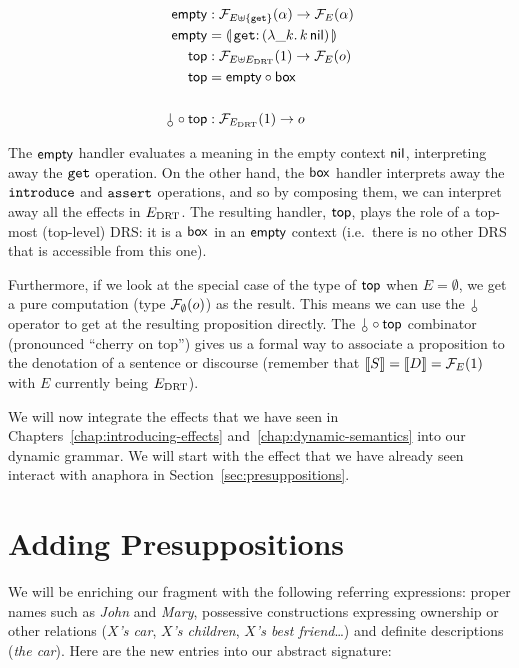 \begin{align*}
  \EMPTY &: \FF_{E \uplus \{\op{get}\}}(\alpha) \to \FF_E(\alpha) \\
  \EMPTY &= \banana{\onto{\op{get}}{(\lam{\_ k}{\ap{k}{\nil}})}} \\
  \TOP &: \FF_{E \uplus E_\DRT}(1) \to \FF_{E}(o) \\
  \TOP &= \EMPTY \comp \BOX \\
  \\
  \cherry \comp \TOP &: \FF_{E_\DRT}(1) \to o
\end{align*}

The $\mathsf{empty}$ handler evaluates a meaning in the empty context $\mathsf{nil}$,
interpreting away the $\mathtt{get}$ operation. On the other hand, the $\mathsf{box}$
handler interprets away the $\mathtt{introduce}$ and $\mathtt{assert}$ operations,
and so by composing them, we can interpret away all the effects in
$E_{\mathrm{DRT}}$. The resulting handler, $\mathsf{top}$, plays the role of a top-most
(top-level) DRS: it is a $\mathsf{box}$ in an $\mathsf{empty}$ context (i.e.\ there is no
other DRS that is accessible from this one).

Furthermore, if we look at the special case of the type of $\mathsf{top}$ when
$E = \emptyset$, we get a pure computation (type $\mathcal{F}_\emptyset(o)$) as the
result. This means we can use the $\cherry$ operator to get at the
resulting proposition directly. The $\cherry \comp \TOP$ combinator
(pronounced ``cherry on top'') gives us a formal way to associate a
proposition to the denotation of a sentence or discourse (remember that
$\llbracket S \rrbracket = \llbracket D \rrbracket = \mathcal{F}_E(1)$ with $E$ currently being $E_{\mathrm{DRT}}$).

We will now integrate the effects that we have seen in
Chapters~\ref{chap:introducing-effects} and~\ref{chap:dynamic-semantics}
into our dynamic grammar. We will start with the effect that we have
already seen interact with anaphora in Section~\ref{sec:presuppositions}.


\section{Adding Presuppositions}
\label{sec:adding-presuppositions}

We will be enriching our fragment with the following referring expressions:
proper names such as \emph{John} and \emph{Mary}, possessive constructions
expressing ownership or other relations (\emph{$X$'s car}, \emph{$X$'s
  children}, \emph{$X$'s best friend}\ldots) and definite descriptions
(\emph{the car}). Here are the new entries into our abstract signature:

